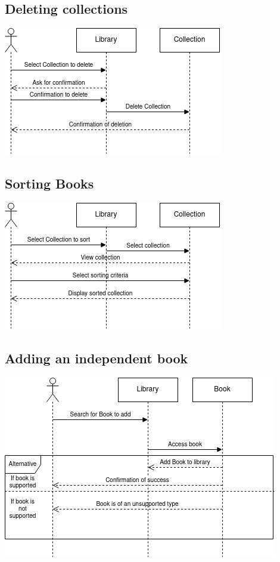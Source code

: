 \documentclass[answers]{exam}
\begin{document}
\subsection{Deleting collections}
\begin{center}
\includegraphics[scale=0.75]{images/seq6.png}    
\end{center}
\subsection{Sorting Books}
\begin{center}
    \includegraphics[scale=0.75]{images/seq7.png}
\end{center}
\subsection{Adding an independent book}
\begin{center}
    \includegraphics[scale=0.75]{images/seq8.png}
\end{center}
\end{document}
